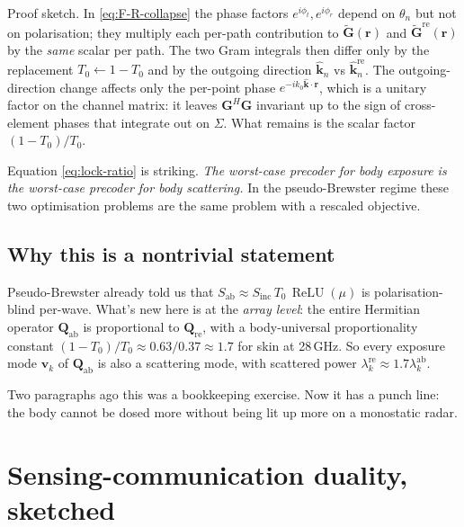 \documentclass[11pt,a4paper]{article}
\theoremstyle{definition}
\newcommand{\khat}{\hat{\bm{k}}}
\newcommand{\rr}{\mathbf{r}}
\newcommand{\Sinc}{S_{\mathrm{inc}}}
\newcommand{\Sab}{S_{\mathrm{ab}}}
\DeclareMathOperator{\ReLU}{ReLU}
\newcommand{\Gtil}{\tilde{\mathbf{G}}}
\newcommand{\Qabs}{\mathbf{Q}_{\mathrm{ab}}}
\newcommand{\Qref}{\mathbf{Q}_{\mathrm{re}}}
\begin{document}
Proof sketch.  In \cref{eq:F-R-collapse} the phase factors
$e^{i\phi_t},e^{i\phi_r}$ depend on $\theta_n$ but not on
polarisation; they multiply each per-path contribution to
$\Gtil(\rr)$ and $\Gtil^{\mathrm{re}}(\rr)$ by the \emph{same} scalar
per path.  The two Gram integrals then differ only by the replacement
$T_0\leftarrow 1-T_0$ and by the outgoing direction $\khat_n$ vs
$\khat_n^{\mathrm{re}}$.  The outgoing-direction change affects only
the per-point phase $e^{-ik_0\khat\cdot\rr}$, which is a unitary
factor on the channel matrix: it leaves
$\mathbf{G}^{\!H}\mathbf{G}$ invariant up to the sign of
cross-element phases that integrate out on $\Sigma$.  What remains
is the scalar factor $(1-T_0)/T_0$.

Equation \cref{eq:lock-ratio} is striking.  \emph{The worst-case
precoder for body exposure is the worst-case precoder for body
scattering.}  In the pseudo-Brewster regime these two optimisation
problems are the same problem with a rescaled objective.

\subsection{Why this is a nontrivial statement}

Pseudo-Brewster already told us that $\Sab\approx\Sinc\,T_0\,\ReLU(\mu)$
is polarisation-blind per-wave.  What's new here is at the
\emph{array level}: the entire Hermitian operator $\Qabs$ is
proportional to $\Qref$, with a body-universal proportionality
constant $(1-T_0)/T_0\approx 0.63/0.37\approx 1.7$ for skin at
28\,GHz.  So every exposure mode $\mathbf{v}_k$ of $\Qabs$ is also a
scattering mode, with scattered power
$\lambda_k^{\mathrm{re}}\approx 1.7\lambda_k^{\mathrm{ab}}$.

Two paragraphs ago this was a bookkeeping exercise.  Now it has a
punch line: the body cannot be dosed more without being lit up more
on a monostatic radar.

\section{Sensing-communication duality, sketched}\label{sec:jsac}
\end{document}
